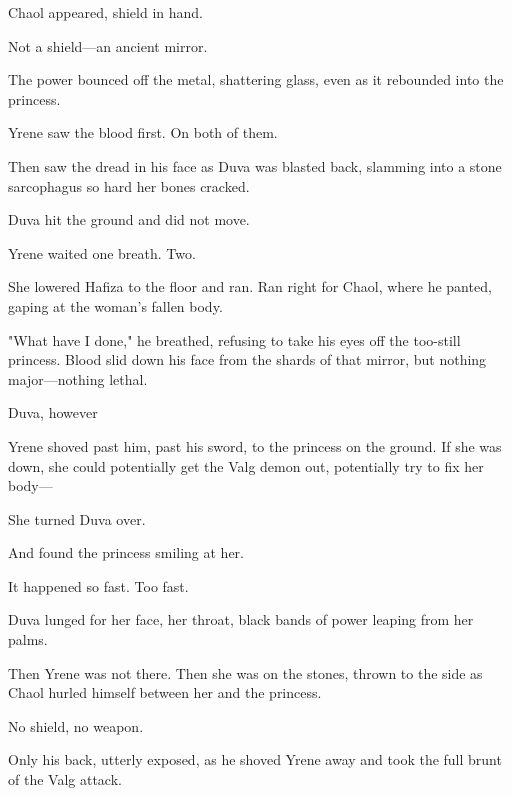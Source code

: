 Chaol appeared, shield in hand.

Not a shield---an ancient mirror.

The power bounced off the metal, shattering glass, even as it rebounded into the princess.

Yrene saw the blood first. On both of them.

Then saw the dread in his face as Duva was blasted back, slamming into a stone sarcophagus so hard her bones cracked.

Duva hit the ground and did not move.

Yrene waited one breath. Two.

She lowered Hafiza to the floor and ran. Ran right for Chaol, where he panted, gaping at the woman's fallen body.

"What have I done," he breathed, refusing to take his eyes off the too-still princess. Blood slid down his face from the shards of that mirror, but nothing major---nothing lethal.

Duva, however 

Yrene shoved past him, past his sword, to the princess on the ground. If she was down, she could potentially get the Valg demon out, potentially try to fix her body---

She turned Duva over.

And found the princess smiling at her.

It happened so fast. Too fast.

Duva lunged for her face, her throat, black bands of power leaping from her palms.

Then Yrene was not there. Then she was on the stones, thrown to the side as Chaol hurled himself between her and the princess.

No shield, no weapon.

Only his back, utterly exposed, as he shoved Yrene away and took the full brunt of the Valg attack.

